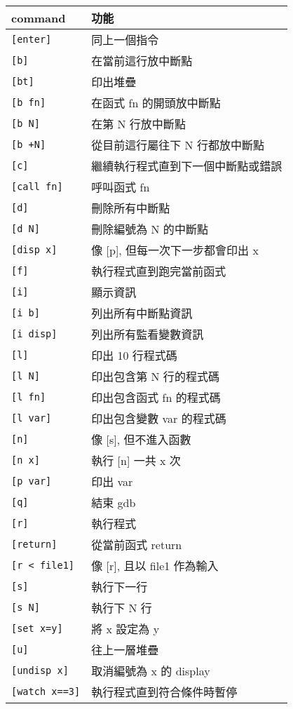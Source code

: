 \begin{tabular}[c]{|l|l|}
    \hline
    command             & 功能 \\
    \hline
    \verb|[enter]|      & 同上一個指令 \\
    \verb|[b]|          & 在當前這行放中斷點 \\
    \verb|[bt]|         & 印出堆疊 \\
    \verb|[b fn]|       & 在函式 fn 的開頭放中斷點 \\
    \verb|[b N]|        & 在第 N 行放中斷點 \\
    \verb|[b +N]|       & 從目前這行屬往下 N 行都放中斷點 \\
    \verb|[c]|          & 繼續執行程式直到下一個中斷點或錯誤 \\
    \verb|[call fn]|    & 呼叫函式 fn \\
    \verb|[d]|          & 刪除所有中斷點 \\
    \verb|[d N]|        & 刪除編號為 N 的中斷點 \\
    \verb|[disp x]|     & 像 [p], 但每一次下一步都會印出 x \\
    \verb|[f]|          & 執行程式直到跑完當前函式 \\
    \verb|[i]|          & 顯示資訊 \\
    \verb|[i b]|        & 列出所有中斷點資訊 \\
    \verb|[i disp]|     & 列出所有監看變數資訊 \\
    \verb|[l]|          & 印出 10 行程式碼  \\
    \verb|[l N]|        & 印出包含第 N 行的程式碼  \\
    \verb|[l fn]|       & 印出包含函式 fn 的程式碼 \\
    \verb|[l var]|      & 印出包含變數 var 的程式碼 \\
    \verb|[n]|          & 像 [s], 但不進入函數 \\
    \verb|[n x]|        & 執行 [n] 一共 x 次 \\
    \verb|[p var]|      & 印出 var \\
    \verb|[q]|          & 結束 gdb \\
    \verb|[r]|          & 執行程式 \\
    \verb|[return]|     & 從當前函式 return \\
    \verb|[r < file1]|  & 像 [r], 且以 file1 作為輸入 \\
    \verb|[s]|          & 執行下一行 \\
    \verb|[s N]|        & 執行下 N 行 \\
    \verb|[set x=y]|    & 將 x 設定為 y \\
    \verb|[u]|          & 往上一層堆疊 \\
    \verb|[undisp x]|   & 取消編號為 x 的 display \\
    \verb|[watch x==3]| & 執行程式直到符合條件時暫停 \\
    \hline
\end{tabular}